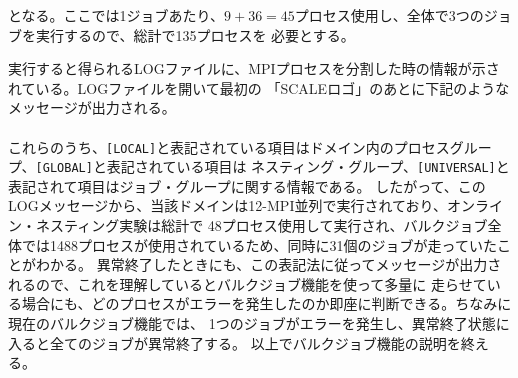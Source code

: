 となる。ここでは1ジョブあたり、$9 + 36 = 45$プロセス使用し、全体で3つのジョブを実行するので、総計で135プロセスを
必要とする。

実行すると得られるLOGファイルに、MPIプロセスを分割した時の情報が示されている。LOGファイルを開いて最初の
「SCALEロゴ」のあとに下記のようなメッセージが出力される。\\

\\

これらのうち、\verb|[LOCAL]|と表記されている項目はドメイン内のプロセスグループ、\verb|[GLOBAL]|と表記されている項目は
ネスティング・グループ、\verb|[UNIVERSAL]|と表記されて項目はジョブ・グループに関する情報である。
したがって、このLOGメッセージから、当該ドメインは12-MPI並列で実行されており、オンライン・ネスティング実験は総計で
48プロセス使用して実行され、バルクジョブ全体では1488プロセスが使用されているため、同時に31個のジョブが走っていたことがわかる。
異常終了したときにも、この表記法に従ってメッセージが出力されるので、これを理解しているとバルクジョブ機能を使って多量に
走らせている場合にも、どのプロセスがエラーを発生したのか即座に判断できる。ちなみに現在のバルクジョブ機能では、
1つのジョブがエラーを発生し、異常終了状態に入ると全てのジョブが異常終了する。
以上でバルクジョブ機能の説明を終える。


